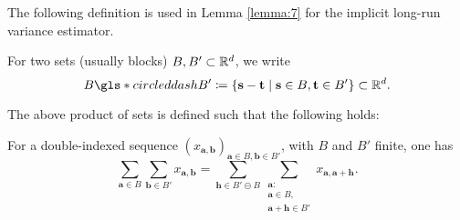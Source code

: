 The following definition is used in Lemma \ref{lemma:7} for the implicit long-run variance estimator.
\begin{defn}
    For two sets (usually blocks) $B, B' \subset \mathbb{R}^d$, we write
    \[ B \gls*{circleddash} B' \coloneqq \{ \mathbf{s} - \mathbf{t} \mid \mathbf{s} \in B, \mathbf{t} \in B' \} \subset \RR^d.  \] %
\end{defn}
The above product of sets is defined such that the following holds:
\begin{lemma} \label{lemma regarding set product double sum}
    For a double-indexed sequence $(x_{\mathbf{a}, \mathbf{b}})_{\mathbf{a} \in B, \mathbf{b} \in B'}$, with $B$ and $B'$ finite, one has
    \[ \sum\limits_{\mathbf{a} \in B} \sum\limits_{\mathbf{b} \in B'} x_{\mathbf{a}, \mathbf{b}} = \sum\limits_{\mathbf{h} \in B' \circleddash B} \sum\limits_{\substack{\mathbf{a}:\\ \mathbf{a} \in B,\\ \mathbf{a}+\mathbf{h} \in B'}} x_{\mathbf{a}, \mathbf{a}+\mathbf{h}}.\]
\end{lemma}
